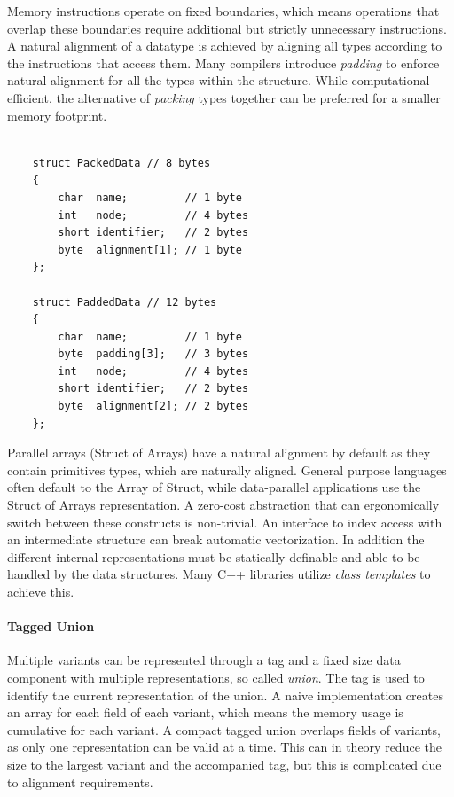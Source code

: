 \documentclass{article}
\begin{document}
Memory instructions operate on fixed boundaries, which means operations that overlap these boundaries require additional but strictly unnecessary instructions.
A natural alignment of a datatype is achieved by aligning all types according to the instructions that access them.
Many compilers introduce {\it padding} to enforce natural alignment for all the types within the structure.
While computational efficient, the alternative of {\it packing} types together can be preferred for a smaller memory footprint.  

\begin{verbatim}

    struct PackedData // 8 bytes
    {
        char  name;         // 1 byte
        int   node;         // 4 bytes
        short identifier;   // 2 bytes
        byte  alignment[1]; // 1 byte
    };

    struct PaddedData // 12 bytes
    {
        char  name;         // 1 byte
        byte  padding[3];   // 3 bytes
        int   node;         // 4 bytes
        short identifier;   // 2 bytes
        byte  alignment[2]; // 2 bytes
    };    

\end{verbatim}

Parallel arrays (Struct of Arrays) have a natural alignment by default as they contain primitives types, which are naturally aligned.
General purpose languages often default to the Array of Struct, while data-parallel applications use the Struct of Arrays representation.
A zero-cost abstraction that can ergonomically switch between these constructs is non-trivial.
An interface to index access with an intermediate structure can break automatic vectorization\cite{abstraction-vectorization}. 
In addition the different internal representations must be statically definable and able to be handled by the data structures.
Many C++ libraries utilize {\it class templates} to achieve this\cite{abstraction-vectorization}.

\paragraph{Tagged Union}

Multiple variants can be represented through a tag and a fixed size data component with multiple representations, so called {\it union}.
The tag is used to identify the current representation of the union. 
A naive implementation creates an array for each field of each variant, which means the memory usage is cumulative for each variant. 
A compact tagged union overlaps fields of variants, as only one representation can be valid at a time.
This can in theory reduce the size to the largest variant and the accompanied tag, but this is complicated due to alignment requirements\cite{accelerate-sum-types}.
\end{document}
